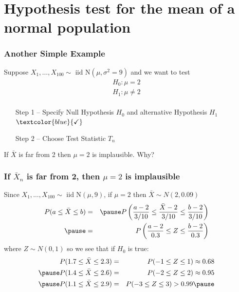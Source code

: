 \section{Hypothesis test for the mean of a normal population}
\begin{frame}
  \frametitle{Another Simple Example}
  
  Suppose $X_1, \dots, X_{100} \sim \mbox{ iid N}(\mu, \sigma^2 = 9)$ and we want to test
  \[
    \begin{array}{c}
      H_0\colon \mu = 2\\
      H_1\colon \mu \neq 2\\
    \end{array}
  \]

  \pause

  \begin{enumerate}
    \item[Step 1] -- Specify Null Hypothesis $H_0$ and alternative Hypothesis $H_1$ $\textcolor{blue}{\checkmark}$\pause
    \item[Step 2] -- \alert{Choose Test Statistic $T_n$}
  \end{enumerate}

  \pause

  If $\bar{X}$ is far from 2 then $\mu=2$ is implausible. Why?

\end{frame}
\begin{frame}
  \frametitle{If $\bar{X}_n$ is far from 2, then $\mu = 2$ is implausible}

  Since $X_1, \dots, X_{100} \sim \mbox{ iid N}(\mu, 9)$, \alert{if $\mu = 2$ then $\bar{X} \sim N(2, 0.09)$}
  \begin{eqnarray*}
     P(a \leq \bar{X} \leq b) &=& \pause P\left(\frac{a - 2}{3/10} \leq \frac{\bar{X}-2}{3/10} \leq \frac{b - 2}{3/10} \right)\\ \pause
     &=& P\left( \frac{a-2}{0.3} \leq Z \leq \frac{b-2}{0.3} \right)
  \end{eqnarray*}
  where $Z \sim N(0,1)$ so we see that if $H_0$ is true: \pause
  \begin{eqnarray*}
    P(1.7 \leq \bar{X} \leq 2.3) &=& P(-1 \leq Z \leq 1) \approx 0.68\\ \pause
    P(1.4 \leq \bar{X} \leq 2.6) &=& P(-2 \leq Z \leq 2) \approx 0.95 \\ \pause
    P(1.1 \leq \bar{X} \leq 2.9) &=& P(-3 \leq Z \leq 3) > 0.99 \pause
  \end{eqnarray*}

\end{frame}
